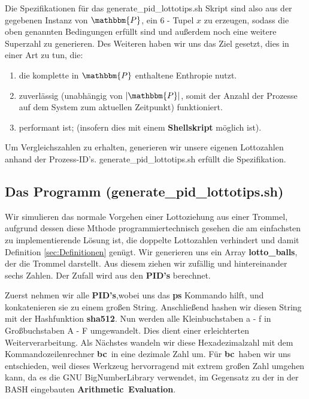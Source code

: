 \documentclass[11pt,a4paper]{article}
\newcommand{\tmsamp}[1]{\textsf{#1}}
\newcommand{\tmtexttt}[1]{{\ttfamily{#1}}}
\newcommand{\extname}[1]{\mbox{\textbf{#1}}}
\newcommand{\bc}{\extname{bc }}
\begin{document}
Die Spezifikationen für das {\tmsamp{generate\_pid\_lottotips.sh}} Skript sind also aus der gegebenen Instanz von $\mathbbm{P}$, ein 6 - Tupel $x$ zu erzeugen, sodass die oben genannten Bedingungen erfüllt sind und außerdem noch eine weitere Superzahl zu generieren.
Des Weiteren haben wir uns das Ziel gesetzt, dies in einer Art zu tun, die:
\begin{enumerate}
  \item die komplette in $\mathbbm{P}$ enthaltene Enthropie nutzt.
  
  \item zuverlässig (unabhängig von $| \mathbbm{P} |$, somit der Anzahl der
  Prozesse auf dem System zum aktuellen Zeitpunkt) funktioniert.
  
  \item performant ist; (insofern dies mit einem \extname{Shellskript} möglich ist).
\end{enumerate}
Um Vergleichszahlen zu erhalten, generieren wir unsere eigenen Lottozahlen anhand der Prozess-ID's.
{\tmsamp{generate\_pid\_lottotips.sh}} erfüllt die Spezifikation.

\subsection{Das Programm (\tmtexttt{}generate\_pid\_lottotips.sh)}

Wir simulieren das normale Vorgehen einer Lottoziehung aus einer Trommel, aufgrund dessen diese Mthode programmiertechnisch gesehen die am einfachsten zu implementierende Lösung ist, die doppelte Lottozahlen verhindert und damit Definition \ref{sec:Definitionen} genügt.
Wir generieren uns ein Array \extname{lotto\_balls}, der die Trommel darstellt.
Aus diesem ziehen wir zufällig und hintereinander sechs Zahlen.
Der Zufall wird aus den \extname{PID's} berechnet.


Zuerst nehmen wir alle \extname{PID's},wobei uns das \extname{ps} Kommando hilft, und konkatenieren sie zu einem großen String.
Anschließend hashen wir diesen String mit der Hashfunktion \extname{sha512}. Nun werden alle Kleinbuchstaben a - f in Großbuchstaben A - F umgewandelt. Dies dient einer erleichterten Weiterverarbeitung. Als Nächstes wandeln wir diese Hexadezimalzahl mit dem Kommandozeilenrechner \bc in eine dezimale Zahl um.
Für \bc haben wir uns entschieden, weil dieses Werkzeug hervorragend mit extrem großen Zahl umgehen kann, da es die GNU BigNumberLibrary verwendet, im Gegensatz zu der in der BASH eingebauten \extname{Arithmetic Evaluation}.
\end{document}
